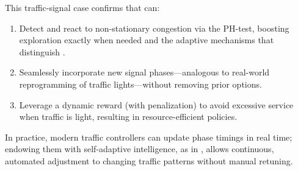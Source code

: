 This traffic-signal case confirms that \adaptiverl can:
\begin{enumerate}
  \item Detect and react to non-stationary congestion via the PH-test, boosting exploration exactly when needed and the adaptive mechanisms that distinguish \adaptiverl.
  \item Seamlessly incorporate new signal phases---analogous to real-world reprogramming of traffic lights---without removing prior options.
  \item Leverage a dynamic reward (with penalization) to avoid excessive service when traffic is light, resulting in resource-efficient policies.
\end{enumerate}
In practice, modern traffic controllers can update phase timings in real time; endowing them with self-adaptive intelligence, as in \adaptiverl, allows continuous, automated adjustment to changing traffic patterns without manual retuning.

\endinput

